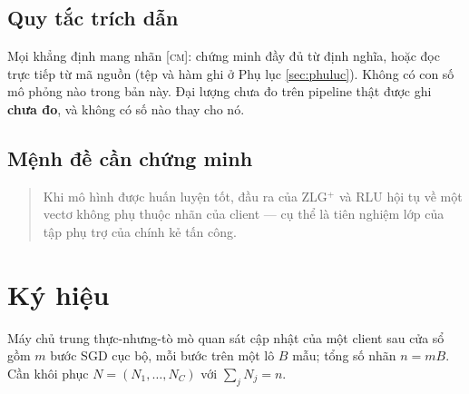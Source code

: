 \documentclass[11pt,a4paper]{article}
\theoremstyle{remark}
\begin{document}
\subsection{Quy tắc trích dẫn}

Mọi khẳng định mang nhãn \textsc{[cm]}: chứng minh đầy đủ từ định nghĩa, hoặc
đọc trực tiếp từ mã nguồn (tệp và hàm ghi ở Phụ lục \ref{sec:phuluc}). Không
có con số mô phỏng nào trong bản này. Đại lượng chưa đo trên pipeline thật
được ghi \textbf{chưa đo}, và không có số nào thay cho nó.

\subsection{Mệnh đề cần chứng minh}

\begin{quote}
Khi mô hình được huấn luyện tốt, đầu ra của ZLG$^+$ và RLU hội tụ về một
vectơ không phụ thuộc nhãn của client --- cụ thể là tiên nghiệm lớp của tập
phụ trợ của chính kẻ tấn công.
\end{quote}

\section{Ký hiệu}
\label{sec:ki-hieu}

Máy chủ trung thực-nhưng-tò mò quan sát cập nhật của một client sau cửa sổ
gồm $m$ bước SGD cục bộ, mỗi bước trên một lô $B$ mẫu; tổng số nhãn $n=mB$.
Cần khôi phục $N=(N_1,\dots,N_C)$ với $\sum_j N_j=n$.
\end{document}
